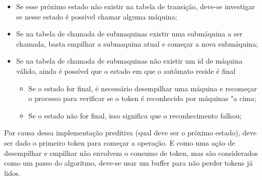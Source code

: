 \begin{itemize}
  \item Se esse próximo estado não existir na tabela de transição, deve-se investigar se nesse estado é possível chamar alguma máquina;

  \item Se na tabela de chamada de submaquinas existir uma submáquina a ser chamada, basta empilhar a submaquina atual e começar a nova submáquina;

  \item Se na tabela de chamada de submaquinas não existir um id de máquina válido, ainda é possível que o estado em que o autômato reside é final
  \begin{itemize}
	\item Se o estado for final, é necessário desempilhar uma máquina e recomeçar o processo para verificar se o token é reconhecido por máquinas "a cima;
    \item Se o estado não for final, isso significa que o reconhecimento falhou;
    
  \end{itemize}

\end{itemize}

Por causa dessa implementação preditiva (qual deve ser o próximo estado), deve ser dado o primeiro token para começar a operação. E como uma ação de desempilhar e empilhar não envolvem o consumo de token, mas são considerados como um passo do algoritmo, deve-se usar um buffer para não perder tokens já lidos.
